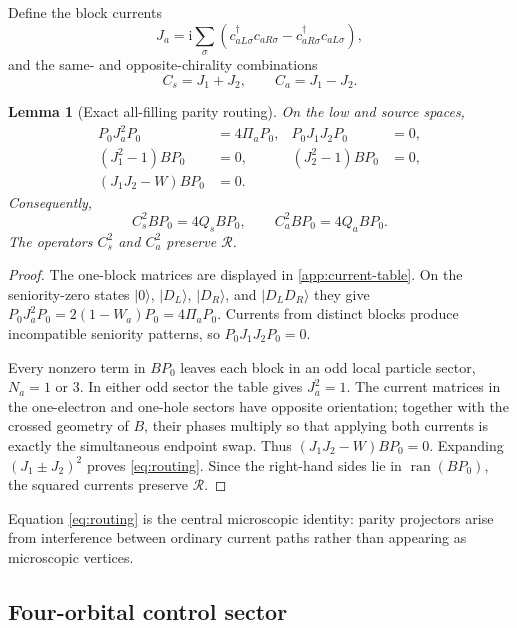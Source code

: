 \documentclass[11pt]{article}
\newtheorem{lemma}[theorem]{Lemma}
\theoremstyle{definition}
\theoremstyle{remark}
\newcommand{\I}{\mathrm i}
\newcommand{\cR}{\mathcal R}
\newcommand{\ket}[1]{\lvert #1\rangle}
\begin{document}
Define the block currents
\begin{equation}
 J_a=\I\sum_\sigma(c_{aL\sigma}^\dagger c_{aR\sigma}-c_{aR\sigma}^\dagger c_{aL\sigma}),
\end{equation}
and the same- and opposite-chirality combinations
\begin{equation}
 C_s=J_1+J_2,
 \qquad
 C_a=J_1-J_2.
 \label{eq:CsCa}
\end{equation}

\begin{lemma}[Exact all-filling parity routing]
\label{lem:routing}
On the low and source spaces,
\begin{align}
 P_0J_a^2P_0&=4\Pi_aP_0,
 &P_0J_1J_2P_0&=0,
 \label{eq:low-current}\\
 (J_1^2-1)BP_0&=0,
 &(J_2^2-1)BP_0&=0,
 \label{eq:range-current1}\\
 (J_1J_2-W)BP_0&=0.
 \label{eq:range-current2}
\end{align}
Consequently,
\begin{equation}
 \boxed{C_s^2BP_0=4Q_sBP_0,\qquad C_a^2BP_0=4Q_aBP_0.}
 \label{eq:routing}
\end{equation}
The operators $C_s^2$ and $C_a^2$ preserve $\cR$.
\end{lemma}

\begin{proof}
The one-block matrices are displayed in \cref{app:current-table}.  On the seniority-zero states $\ket0$, $\ket{D_L}$, $\ket{D_R}$, and $\ket{D_LD_R}$ they give $P_0J_a^2P_0=2(1-W_a)P_0=4\Pi_aP_0$.  Currents from distinct blocks produce incompatible seniority patterns, so $P_0J_1J_2P_0=0$.

Every nonzero term in $BP_0$ leaves each block in an odd local particle sector, $N_a=1$ or $3$.  In either odd sector the table gives $J_a^2=1$.  The current matrices in the one-electron and one-hole sectors have opposite orientation; together with the crossed geometry of $B$, their phases multiply so that applying both currents is exactly the simultaneous endpoint swap.  Thus $(J_1J_2-W)BP_0=0$.  Expanding $(J_1\pm J_2)^2$ proves \eqref{eq:routing}.  Since the right-hand sides lie in $\operatorname{ran}(BP_0)$, the squared currents preserve $\cR$.
\end{proof}

Equation \eqref{eq:routing} is the central microscopic identity: parity projectors arise from interference between ordinary current paths rather than appearing as microscopic vertices.

\subsection{Four-orbital control sector}
\label{sec:control-sector}
\end{document}
